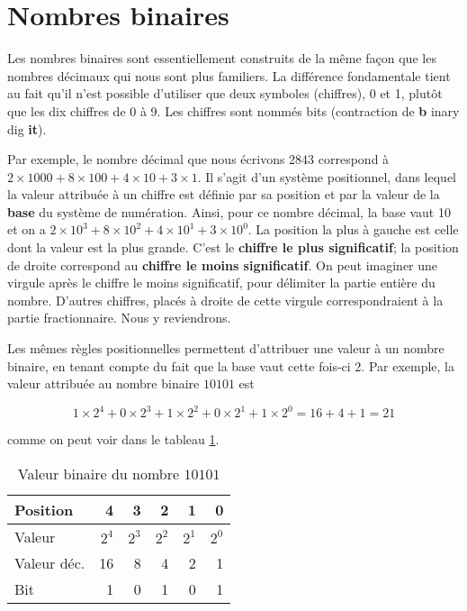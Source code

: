 \documentclass[letter, oneside]{book}
\begin{document}
\section{Nombres binaires}
\label{sec:org92c29cb}

Les nombres binaires sont essentiellement construits de la même façon
que les nombres décimaux qui nous sont plus familiers. La
différence fondamentale tient au fait qu'il n'est possible d'utiliser
que deux symboles (chiffres), 0 et 1, plutôt que les dix chiffres de 0
à 9. Les chiffres sont nommés bits (contraction de \textbf{b} inary dig
\textbf{it}).

Par exemple, le nombre décimal que nous écrivons \(2843\) correspond à
\(2 \times 1000 + 8 \times 100 + 4 \times 10 + 3 \times 1\). Il s'agit
d'un système positionnel, dans lequel la valeur attribuée à un chiffre
est définie par sa position et par la valeur de la \textbf{base} du système
de numération. Ainsi, pour ce nombre décimal, la base vaut 10 et on a
\(2 \times 10^3 + 8 \times 10^2 + 4 \times 10^1 + 3 \times 10^0\). La
position la plus à gauche est celle dont la valeur est la plus
grande. C'est le \textbf{chiffre le plus significatif}; la position de droite
correspond au \textbf{chiffre le moins significatif}. On peut imaginer une
virgule après le chiffre le moins significatif, pour délimiter la
partie entière du nombre. D'autres chiffres, placés à droite de cette
virgule correspondraient à la partie fractionnaire. Nous y reviendrons.

Les mêmes règles positionnelles permettent d'attribuer une valeur à un
nombre binaire, en tenant compte du fait que la base vaut cette
fois-ci 2. Par exemple, la valeur attribuée au nombre binaire
\(10101\) est 

$$1 \times 2^4 + 0 \times 2^3 + 1 \times 2^2 + 0 \times 2^1 + 1
\times 2^0 = 16+4+1= 21$$

comme on peut voir dans le tableau \ref{tab:org19f58f4}.

\begin{table}[htbp]
\caption{\label{tab:org19f58f4}Valeur binaire du nombre \(10101\)}
\centering
\begin{tabular}{lrrrrr}
Position & 4 & 3 & 2 & 1 & 0\\[0pt]
\hline
Valeur & \(2^4\) & \(2^3\) & \(2^2\) & \(2^1\) & \(2^0\)\\[0pt]
Valeur déc. & 16 & 8 & 4 & 2 & 1\\[0pt]
Bit & 1 & 0 & 1 & 0 & 1\\[0pt]
\end{tabular}
\end{table}
\end{document}
